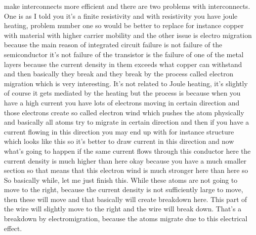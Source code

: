 make interconnects more efficient and there are two problems with interconnects. One is as I told you it's a finite resistivity and with resistivity you have joule heating, problem number one so would be better to replace for instance copper with material with higher carrier mobility and the other issue is electro migration because the main reason of integrated circuit failure is not failure of the semiconductor it's not failure of the transistor is the failure of one of the metal layers because the current density in them exceeds what copper can withstand and then basically they break and they break by the process called electron migration which is very interesting. It's not related to Joule heating, it's slightly of course it gets mediated by the heating but the process is because when you have a high current you have lots of electrons moving in certain direction and those electrons create so called electron wind which pushes the atom physically and basically all atoms try to migrate in certain direction and then if you have a current flowing in this direction you may end up with for instance structure which looks like this so it's better to draw current in this direction and now what's going to happen if the same current flows through this conductor here the current density is much higher than here okay because you have a much smaller section so that means that this electron wind is much stronger here than here so So basically while, let me just finish this. While these atoms are not going to move to the right, because the current density is not sufficiently large to move, then these will move and that basically will create breakdown here. This part of the wire will slightly move to the right and the wire will break down. That's a breakdown by electromigration, because the atoms migrate due to this electrical effect.\\
